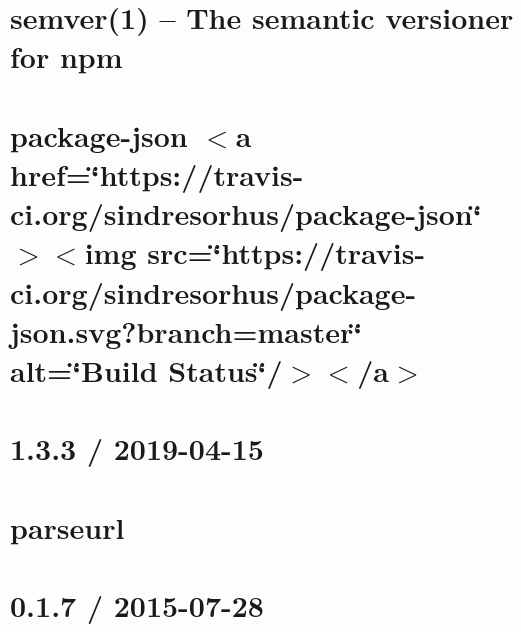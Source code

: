 \let\mypdfximage\pdfximage\def\pdfximage{\immediate\mypdfximage}\documentclass[twoside]{book}
\newcommand{\+}{\discretionary{\mbox{\scriptsize$\hookleftarrow$}}{}{}}
\begin{document}
\chapter{semver(1) -- The semantic versioner for npm}
\label{md__c_1__git_hub__p_r_o_y_e_c_t_o-_i_i_i-_g_o_t_rest-api-node-mysql_node_modules_package-json_node_modules_semver__r_e_a_d_m_e}

\chapter{package-\/json $<$a href=\char`\"{}https\+://travis-\/ci.\+org/sindresorhus/package-\/json\char`\"{}$>$$<$img src=\char`\"{}https\+://travis-\/ci.\+org/sindresorhus/package-\/json.\+svg?branch=master\char`\"{} alt=\char`\"{}\+Build Status\char`\"{}/$>$$<$/a$>$}
\label{md__c_1__git_hub__p_r_o_y_e_c_t_o-_i_i_i-_g_o_t_rest-api-node-mysql_node_modules_package-json_readme}

\chapter{1.3.3 / 2019-\/04-\/15}
\label{md__c_1__git_hub__p_r_o_y_e_c_t_o-_i_i_i-_g_o_t_rest-api-node-mysql_node_modules_parseurl__h_i_s_t_o_r_y}

\chapter{parseurl}
\label{md__c_1__git_hub__p_r_o_y_e_c_t_o-_i_i_i-_g_o_t_rest-api-node-mysql_node_modules_parseurl__r_e_a_d_m_e}

\chapter{0.1.7 / 2015-\/07-\/28}
\label{md__c_1__git_hub__p_r_o_y_e_c_t_o-_i_i_i-_g_o_t_rest-api-node-mysql_node_modules_path-to-regexp__history}

\end{document}
